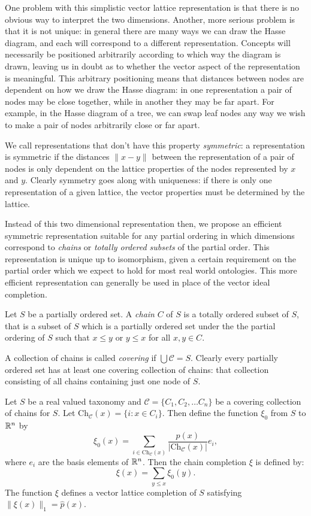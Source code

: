 \documentclass{report}
\begin{document}
One problem with this simplistic vector lattice representation is that there is no obvious way to interpret the two dimensions. Another, more serious problem is that it is not unique: in general there are many ways we can draw the Hasse diagram, and each will correspond to a different representation. Concepts will necessarily be positioned arbitrarily according to which way the diagram is drawn, leaving us in doubt as to whether the vector aspect of the representation is meaningful. This arbitrary positioning means that distances between nodes are dependent on how we draw the Hasse diagram: in one representation a pair of nodes may be close together, while in another they may be far apart. For example, in the Hasse diagram of a tree, we can swap leaf nodes any way we wish to make a pair of nodes arbitrarily close or far apart.

We call representations that don't have this property \emph{symmetric}: a representation is symmetric if the distances $\|x - y\|$ between the representation of a pair of nodes is only dependent on the lattice properties of the nodes represented by $x$ and $y$. Clearly symmetry goes along with uniqueness: if there is only one representation of a given lattice, the vector properties must be determined by the lattice.

Instead of this two dimensional representation then, we propose an efficient symmetric representation suitable for any partial ordering in which dimensions correspond to \emph{chains} or \emph{totally ordered subsets} of the partial order. This representation is unique up to isomorphism, given a certain requirement on the partial order which we expect to hold for most real world ontologies. This more efficient representation can generally be used in place of the vector ideal completion.

\begin{defn}[Chains]
Let $S$ be a partially ordered set. A \emph{chain} $C$ of $S$ is a totally ordered subset of $S$, that is a subset of $S$ which is a partially ordered set under the the partial ordering of $S$ such that $x \le y$ or $y \le x$ for all $x,y \in C$.

A collection of chains is called \emph{covering} if $\bigcup \mathcal{C} = S$. Clearly every partially ordered set has at least one covering collection of chains: that collection consisting of all chains containing just one node of $S$.
\end{defn}

\begin{prop}
\newcommand{\Ch}{\mathrm{Ch}_\mathcal{C}}
Let $S$ be a real valued taxonomy and $\mathcal{C} = \{C_1, C_2, \ldots C_n\}$ be a covering collection of chains for $S$. Let $\Ch(x) = \{i : x \in C_i\}.$ Then define the function $\xi_0$ from $S$ to $\mathbb{R}^n$ by
$$\xi_0(x) =  \sum_{i \in \Ch(x)} \frac{p(x)}{|\Ch(x)|}e_i,$$
where $e_i$ are the basis elements of $\mathbb{R}^n$. Then the chain completion $\xi$ is defined by:
$$\xi(x) = \sum_{y \le x} \xi_0(y).$$
The function $\xi$ defines a vector lattice completion of $S$ satisfying $\|\xi(x)\|_1 = \hat{p}(x)$.
\end{prop}
\end{document}
